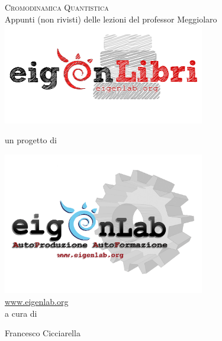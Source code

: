 \documentclass[12pt,a4paper]{article}
\theoremstyle{definition}
\numberwithin{equation}{section}
\begin{document}
\begin{titlepage}
\centering
{\Huge \scshape{Cromodinamica Quantistica}}\\
\vspace*{0.5cm}
{\small Appunti (non rivisti) delle lezioni del professor Meggiolaro}
 \\
\includegraphics[width=250pt,keepaspectratio=true]{Addons/eigenLibrichiaro}
\begin{center}
un progetto di
\end{center}
\includegraphics[width=250pt,keepaspectratio=true]{Addons/eigenlabinvertito2.png} \\
\url{www.eigenlab.org}
 \\
{\small a cura di}\\
\vspace*{0.5cm}
{\normalsize Francesco Cicciarella\par}
\end{titlepage}
\pagebreak
{}
\end{document}
